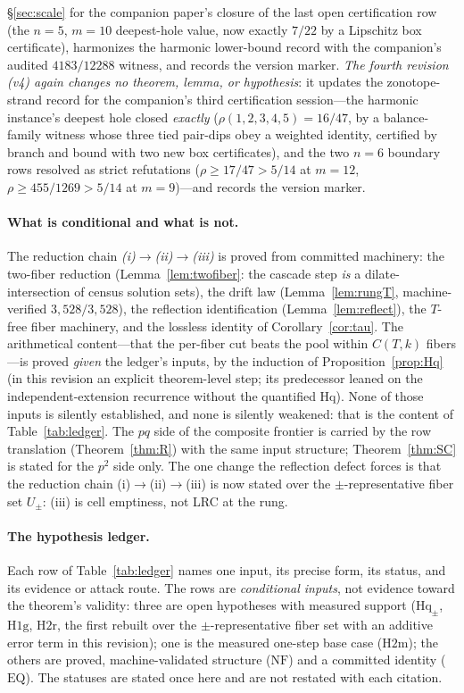 \S\ref{sec:scale} for the companion paper's closure of the last open
certification row (the $n=5$, $m=10$ deepest-hole value, now exactly
$7/22$ by a Lipschitz box certificate), harmonizes the harmonic
lower-bound record with the companion's audited $4183/12288$ witness,
and records the version marker. \emph{The fourth revision (v4) again
changes no theorem, lemma, or hypothesis}: it updates the
zonotope-strand record for the companion's third certification
session---the harmonic instance's deepest hole closed \emph{exactly}
($\rho(1,2,3,4,5)=16/47$, by a balance-family witness whose three tied
pair-dips obey a weighted identity, certified by branch and bound with
two new box certificates), and the two $n=6$ boundary rows resolved as
strict refutations ($\rho\ge17/47>5/14$ at $m=12$,
$\rho\ge455/1269>5/14$ at $m=9$)---and records the version marker.

\paragraph{What is conditional and what is not.}
The reduction chain \emph{(i)}$\to$\emph{(ii)}$\to$\emph{(iii)} is
proved from committed machinery: the two-fiber reduction
(Lemma~\ref{lem:twofiber}: the cascade step \emph{is} a
dilate-intersection of census solution sets), the drift law
(Lemma~\ref{lem:rungT}, machine-verified $3{,}528/3{,}528$), the
reflection identification (Lemma~\ref{lem:reflect}), the
$T$-free fiber machinery, and the lossless identity of
Corollary~\ref{cor:tau}. The arithmetical content---that the per-fiber
cut beats the pool within $C(T,k)$ fibers---is proved \emph{given} the
ledger's inputs, by the induction of Proposition~\ref{prop:Hq} (in
this revision an explicit theorem-level step; its predecessor leaned
on the independent-extension recurrence without the quantified Hq). None of those inputs is silently established, and none
is silently weakened: that is the content of Table~\ref{tab:ledger}. The
$pq$ side of the composite frontier is carried by the row translation
(Theorem~\ref{thm:R}) with the same input structure; Theorem~\ref{thm:SC}
is stated for the $p^2$ side only. The one change the reflection defect
forces is that the reduction chain (i)$\to$(ii)$\to$(iii) is now stated
over the $\pm$-representative fiber set $U_\pm$: (iii) is cell emptiness,
not LRC at the rung.

\paragraph{The hypothesis ledger.}
Each row of Table~\ref{tab:ledger} names one input, its precise form,
its status, and its evidence or attack route. The rows are
\emph{conditional inputs}, not evidence toward the theorem's validity:
three are open hypotheses with measured support ($\mathrm{Hq}_\pm$,
$\mathrm{H1g}$, $\mathrm{H2r}$, the first rebuilt over the
$\pm$-representative fiber set with an additive error term in this
revision); one is the measured one-step base case
($\mathrm{H2m}$); the others are proved, machine-validated structure
($\mathrm{NF}$) and a committed identity ($\mathrm{EQ}$). The statuses
are stated once here and are not restated with each citation.

